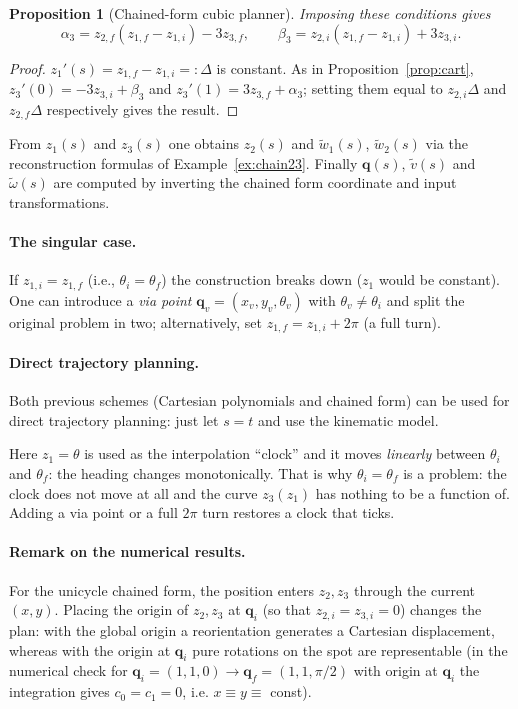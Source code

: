 \documentclass[11pt,a4paper]{article}
\newcommand{\q}{\boldsymbol{q}}
\newcommand{\qi}{\boldsymbol{q}_i}
\newcommand{\qf}{\boldsymbol{q}_f}
\newcommand{\vt}{\tilde v}
\newcommand{\wt}{\tilde\omega}
\newcommand{\wwt}{\tilde w}
\theoremstyle{definition}
\theoremstyle{plain}
\newtheorem{proposition}[definition]{Proposition}
\theoremstyle{remark}
\begin{document}
\begin{proposition}[Chained-form cubic planner]
Imposing these conditions gives
\begin{equation}
\alpha_3=z_{2,f}(z_{1,f}-z_{1,i})-3z_{3,f},\qquad
\beta_3=z_{2,i}(z_{1,f}-z_{1,i})+3z_{3,i}.
\end{equation}
\end{proposition}
\begin{proof}
$z_1'(s)=z_{1,f}-z_{1,i}=:\Delta$ is constant. As in Proposition~\ref{prop:cart},
$z_3'(0)=-3z_{3,i}+\beta_3$ and $z_3'(1)=3z_{3,f}+\alpha_3$; setting them equal to $z_{2,i}\Delta$ and $z_{2,f}\Delta$ respectively
gives the result. \qedhere
\end{proof}

From $z_1(s)$ and $z_3(s)$ one obtains $z_2(s)$ and $\wwt_1(s)$, $\wwt_2(s)$ via the reconstruction formulas of
Example~\ref{ex:chain23}. Finally $\q(s)$, $\vt(s)$ and $\wt(s)$ are computed by inverting the chained form coordinate and
input transformations.

\paragraph{The singular case.} If $z_{1,i}=z_{1,f}$ (i.e., $\theta_i=\theta_f$) the construction breaks down ($z_1$ would be
constant). One can introduce a \emph{via point} $\q_v=(x_v,y_v,\theta_v)$ with $\theta_v\ne\theta_i$ and split the original problem
in two; alternatively, set $z_{1,f}=z_{1,i}+2\pi$ (a full turn).

\paragraph{Direct trajectory planning.} Both previous schemes (Cartesian polynomials and chained form) can be used for direct
trajectory planning: just let $s=t$ and use the kinematic model.

\begin{intuition}
Here $z_1=\theta$ is used as the interpolation ``clock'' and it moves \emph{linearly} between $\theta_i$ and $\theta_f$:
the heading changes monotonically. That is why $\theta_i=\theta_f$ is a problem: the clock does not move at all and the curve
$z_3(z_1)$ has nothing to be a function of. Adding a via point or a full $2\pi$ turn restores a clock that ticks.
\end{intuition}

\paragraph{Remark on the numerical results.} For the unicycle chained form, the position enters $z_2,z_3$ through
the current $(x,y)$. Placing the origin of $z_2,z_3$ at $\qi$ (so that $z_{2,i}=z_{3,i}=0$) changes the plan: with the global origin a
reorientation generates a Cartesian displacement, whereas with the origin at $\qi$ pure rotations on the spot are
representable (in the numerical check for $\qi=(1,1,0)\to\qf=(1,1,\pi/2)$ with origin at $\qi$ the integration gives $c_0=c_1=0$, i.e.
$x\equiv y\equiv$ const).
\end{document}
